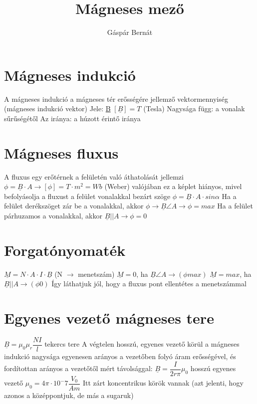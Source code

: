 \documentclass [12pt,a4paper] {article}
\author{Gáspár Bernát}
\title{Mágneses mező}
\begin{document}
\maketitle
\section{Mágneses indukció}
A mágneses indukció a mágneses tér erősségére jellemző vektormennyiség (mágneses indukció vektor)\newline
Jele: \underline{B} \hspace{5mm} $[\underline{B}] = T$ (Tesla) \newline
Nagysága függ: a vonalak sűrűségétől\newline
Az iránya: a húzott érintő iránya\newline

\section{Mágneses fluxus}
A fluxus egy erőtérnek a felületén való áthatolását jellemzi \newline
$\phi = \underline{B} \cdot A \rightarrow [\phi] = T \cdot m^2 = Wb$ (Weber) \newline
valójában ez a képlet hiányos, mivel befolyásolja a fluxust a felület vonalakkal bezárt szöge \newline
$\phi = \underline{B} \cdot A \cdot sin\alpha$ \newline
Ha a felület derékszöget zár be a vonalakkal, akkor $\phi \rightarrow \underline{B} \angle A \rightarrow \phi = max$ \newline
Ha a felület párhuzamos a vonalakkal, akkor $\underline{B} || A \rightarrow \phi = 0$

\section{Forgatónyomaték}
$\underline{M} = N \cdot A \cdot I \cdot \underline{B}$ (N $\rightarrow$ menetszám) \newline
$\underline{M} = 0$, ha $\underline{B} \angle A \rightarrow (\phi max)$ \newline
$\underline{M} = max$, ha $\underline{B} || A \rightarrow (\phi 0)$ \newline
Így láthatjuk jól, hogy a fluxus pont ellentétes a menetszámmal

\section{Egyenes vezető mágneses tere}
$\underline{B} = \mu_0 \mu_r \dfrac{NI}{l}$ tekercs tere \newline
A végtelen hosszú, egyenes vezető körül a mágneses indukció nagysága egyenesen arányos a vezetőben folyó áram erősségével, és fordítottan arányos a vezetőtől mért távolsággal: \newline
$\underline{B} = \dfrac{I}{2r\pi} \mu_0$ hosszú egyenes vezető\newline
$\mu_0 = 4\pi \cdot 10^-7 \dfrac{V_0}{A m}$ \newline
Itt zárt koncentrikus körök vannak (azt jelenti, hogy azonos a középpontjuk, de más a sugaruk)
\end{document}
